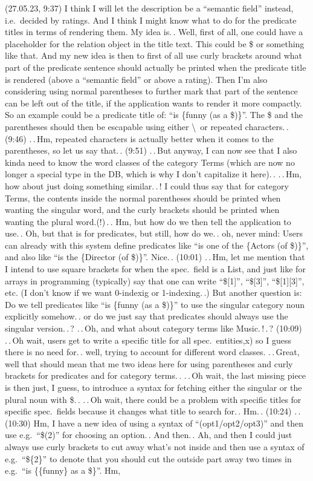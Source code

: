 \documentclass{report}
\begin{document}
(27.05.23, 9:37) I think I will let the description be a ``semantic field'' instead, i.e.\ decided by ratings. And I think I might know what to do for the predicate titles in terms of rendering them. My idea is.\,. Well, first of all, one could have a placeholder for the relation object in the title text. This could be \$ or something like that. And my new idea is then to first of all use curly brackets around what part of the predicate sentence should actually be printed when the predicate title is rendered (above a ``semantic field'' or above a rating). Then I'm also considering using normal parentheses to further mark that part of the sentence can be left out of the title, if the application wants to render it more compactly. So an example could be a predicate title of: ``is \{funny (as a \$)\}''. The \$ and the parentheses should then be escapable using either \textbackslash\ or repeated characters.\,. (9:46) .\,.\,Hm, repeated characters is actually better when it comes to the parentheses, so let us say that.\,. (9:51) .\,.\,But anyway, I can now see that I also kinda need to know the word classes of the category Terms (which are now no longer a special type in the DB, which is why I don't capitalize it here).\,. .\,.\,Hm, how about just doing something similar.\,.\,! I could thus say that for category Terms, the contents inside the normal parentheses should be printed when wanting the singular word, and the curly brackets should be printed when wanting the plural word.(!)\,.\,. Hm, but how do we then tell the application to use.\,. Oh, but that is for predicates, but still, how do we.\,. oh, never mind: Users can already with this system define predicates like ``is one of the \{Actors (of \$)\}'', and also like ``is the \{Director (of \$)\}''. Nice.\,. (10:01) .\,.\,Hm, let me mention that I intend to use square brackets for when the spec.\ field is a List, and just like for arrays in programming (typically) say that one can write ``\$[1]'', ``\$[3]'', ``\$[1][3]'', etc. (I don't know if we want 0-indexig or 1-indexing.\,.) But another question is: Do we tell predicates like ``is \{funny (as a \$)\}'' to use the singular category noun explicitly somehow.\,. or do we just say that predicates should always use the singular version.\,.\,? .\,.\,Oh, and what about category terms like Music.\,!\,.\,? (10:09) .\,.\,Oh wait, users get to write a specific title for all spec.\ entities,x) so I guess there is no need for.\,. well, trying to account for different word classes. .\,.\,Great, well that should mean that me two ideas here for using parentheses and curly brackets for predicates and for category terms.\,. .\,.\,Oh wait, the last missing piece is then just, I guess, to introduce a syntax for fetching either the singular or the plural noun with \$.\,. .\,.\,Oh wait, there could be a problem with specific titles for specific spec.\ fields because it changes what title to search for.\,. Hm.\,. (10:24) .\,.\,(10:30) Hm, I have a new idea of using a syntax of ``(opt1/opt2/opt3)'' and then use e.g.\ ``\$(2)'' for choosing an option.\,. And then.\,. Ah, and then I could just always use curly brackets to cut away what's not inside and then use a syntax of e.g.\ ``\$\{2\}'' to denote that you should cut the outside part away two times in e.g.\ ``is \{\{funny\} as a \$\}''. Hm, 
\end{document}
